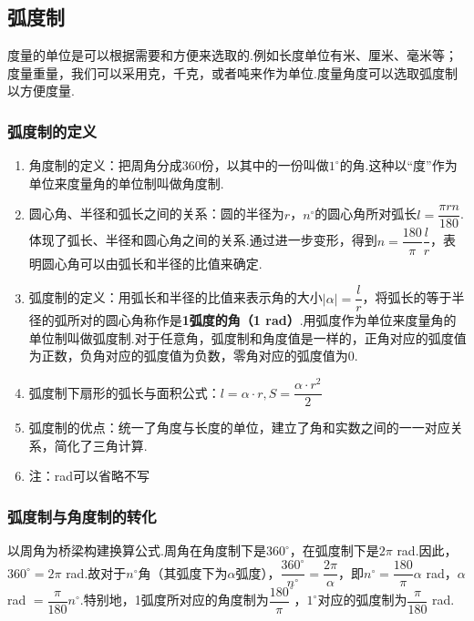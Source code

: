 \subsection*{弧度制}
度量的单位是可以根据需要和方便来选取的.例如长度单位有米、厘米、毫米等；度量重量，我们可以采用克，千克，或者吨来作为单位.度量角度可以选取弧度制以方便度量.
\subsubsection*{弧度制的定义}
\begin{enumerate}
    \item 角度制的定义：把周角分成360份，以其中的一份叫做$1^{\circ}$的角.这种以“度”作为单位来度量角的单位制叫做角度制.
    \item 圆心角、半径和弧长之间的关系：圆的半径为$r$，$n^{\circ}$的圆心角所对弧长$l = \dfrac{\pi r n}{180}$. 体现了弧长、半径和圆心角之间的关系.通过进一步变形，得到$n = \dfrac{180}{\pi} \dfrac{l}{r}$，表明圆心角可以由弧长和半径的比值来确定.
    \item 弧度制的定义：用弧长和半径的比值来表示角的大小$|\alpha| = \dfrac{l}{r}$，将弧长的等于半径的弧所对的圆心角称作是\textbf{1弧度的角（1 rad）}.用弧度作为单位来度量角的单位制叫做弧度制.对于任意角，弧度制和角度值是一样的，正角对应的弧度值为正数，负角对应的弧度值为负数，零角对应的弧度值为0.
    \item 弧度制下扇形的弧长与面积公式：$l = \alpha \cdot r, S = \dfrac{\alpha \cdot r^2}{2}$
    \item 弧度制的优点：统一了角度与长度的单位，建立了角和实数之间的一一对应关系，简化了三角计算.
    \item 注：rad可以省略不写
\end{enumerate}
\subsubsection*{弧度制与角度制的转化}
以周角为桥梁构建换算公式.周角在角度制下是$360^{\circ}$，在弧度制下是$2\pi$ rad.因此，$360^{\circ} = 2\pi$ rad.故对于$n^{\circ}$角（其弧度下为$\alpha$弧度），$\dfrac{360^{\circ}}{n^{\circ}} = \dfrac{2\pi}{\alpha}$，即$n^{\circ} = \dfrac{180}{\pi} \alpha$ rad，$\alpha$ rad $ = \dfrac{\pi}{180} n^{\circ}$.特别地，1弧度所对应的角度制为$\dfrac{180}{\pi}^{\circ}$，$1^{\circ}$对应的弧度制为$\dfrac{\pi}{180}$ rad.

